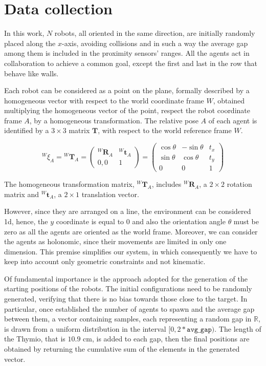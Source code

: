 \section{Data collection}
\label{sec:dataset}

In this work, $N$ robots, all oriented in the same direction, are initially 
randomly placed along the $x$-axis, avoiding collisions and in such a way the 
average gap among them is included in the proximity sensors' ranges. 
All the agents act in collaboration to achieve a common goal, except the first 
and last in the row that behave like walls.

Each robot can be considered as a point on the plane, formally described by a 
homogeneous vector with respect to the world coordinate frame $W$, obtained 
multiplying the homogeneous vector of the point, respect the robot coordinate 
frame $A$, by a homogeneous transformation. The relative pose $A$ of each 
agent is identified by a $3 \times 3$ matrix $\mathbf{T}$, with respect to the 
world reference frame $W$. 
\begin{Equation}[!htb]
	\centering
	\begin{equation}
	{^W\!\xi_A} = {^W\!\mathbf{T}_A} 
	=
	\begin{pmatrix}
	^W\!\mathbf{R}_A & ^W\!\mathbf{t}_A\\
	0, 0 & 1
	\end{pmatrix}
	=
	\begin{pmatrix}
	\cos \theta & - \sin \theta & t_x\\
	\sin \theta & \cos \theta & t_y\\
	0 & 0 & 1
	\end{pmatrix}
	\end{equation}
	\caption[Homogeneous transformation matrix.]{The homogeneous 
		transformation matrix, 	$^W\!\mathbf{T}_A$, includes $^W\!\mathbf{R}_A$, 
		a 
		$2 \times 2$ rotation matrix and $^W\!\mathbf{t}_A$, a $2 \times 1$ 
		translation vector.}
	\label{eq:hommatrix}
\end{Equation}
However, since they are arranged on a line, the environment can be considered 
\gls{1d}, hence, the $y$ coordinate is equal to $0$ and also the orientation angle 
$\theta$ must be zero as all the agents are oriented as the world frame. 
Moreover, we can consider the agents as holonomic, since their movements are 
limited in only one dimension. This premise simplifies our system, in which 
consequently we have to keep into account only geometric constraints and not
kinematic.

Of fundamental importance is the approach adopted for the generation of the 
starting positions of the robots.
The initial configurations need to be randomly generated, verifying that there is 
no bias towards those close to the target.
In particular, once established the number of agents to spawn and the average 
gap between them, a vector containing samples, each representing a random 
gap in $\mathbb{R}$, is drawn from a uniform distribution in the interval $[0, 
2*\mathtt{avg\_gap})$. 
The length of the Thymio, that is $10.9$ \gls{cm}, is added to each gap, then the 
final positions are obtained by returning the cumulative sum of the elements in 
the generated vector. 

